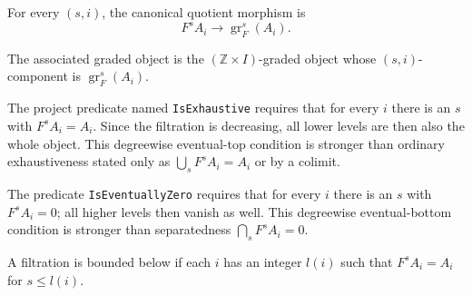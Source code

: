 \begin{definition}
  \leanok
  \label{def:core-to-associated-graded}
  For every $(s,i)$, the canonical quotient morphism is
  \[
    F^sA_i\longrightarrow \operatorname{gr}^s_F(A_i).
  \]
\end{definition}

\begin{definition}
  \leanok
  \label{def:core-associated-graded-object}
  The associated graded object is the $(\mathbb Z\times I)$-graded object
  whose $(s,i)$-component is $\operatorname{gr}^s_F(A_i)$.
\end{definition}

\begin{definition}
  \leanok
  \label{def:core-exhaustive-filtration}
  The project predicate named \texttt{IsExhaustive} requires that for every
  $i$ there is an $s$ with $F^sA_i=A_i$.  Since the filtration is decreasing,
  all lower levels are then also the whole object.  This degreewise
  eventual-top condition is stronger than ordinary exhaustiveness stated only
  as $\bigcup_sF^sA_i=A_i$ or by a colimit.
\end{definition}

\begin{definition}
  \leanok
  \label{def:core-eventually-zero-filtration}
  The predicate \texttt{IsEventuallyZero} requires that for every $i$ there
  is an $s$ with $F^sA_i=0$; all higher levels then vanish as well.  This
  degreewise eventual-bottom condition is stronger than separatedness
  $\bigcap_sF^sA_i=0$.
\end{definition}

\begin{definition}
  \leanok
  \label{def:core-bounded-below-filtration}
  A filtration is bounded below if each $i$ has an integer $l(i)$ such
  that $F^sA_i=A_i$ for $s\le l(i)$.
\end{definition}

